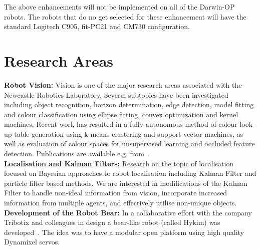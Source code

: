 \documentclass{llncs}
\begin{document}
The above enhancements will not be implemented on all of the Darwin-OP robots. The robots that do no get selected for these enhancement will have the standard Logitech C905, fit-PC21 and CM730 configuration.

\section{Research Areas}

\noindent\textbf{Robot Vision:} Vision is one of the major research areas associated with the Newcastle Robotics Laboratory. Several subtopics have been investigated including object recognition, horizon determination, edge detection, model fitting and colour classification using ellipse fitting, convex optimization and kernel machines. Recent work has resulted in a fully-autonomous method of colour look-up table generation using k-means clustering and support vector machines, as well as evaluation of colour spaces for unsupervised learning and occluded feature detection. Publications are available e.g. from~\cite{budden2012colour,budden2012ball,henderson_2007,nickin_2007,NUBOT2006,Henderson2008}.
\\

\noindent\textbf{Localisation and Kalman Filters:} Research on the
topic of localisation focused on Bayesian approaches to robot
localisation including Kalman Filter and particle filter
based methods. We are interested in 
modifications of the Kalman Filter to handle non-ideal information
from vision, incorporate increased information from multiple agents, 
and effectively utilise non-unique objects.
\\

\noindent\textbf{Development of the Robot Bear:} In a collaborative
effort with the company Tribotix and colleagues in design a
bear-like robot (called Hykim) was developed~\cite{ChalupEtAl2006}. The idea was to have a modular open platform using high quality Dynamixel servos. 
\\
\end{document}
